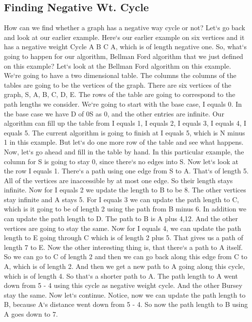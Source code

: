 \subsection{Finding Negative Wt.
Cycle}
How can we find whether a graph has a negative way cycle or not? Let`s go back and look at our earlier example.
Here`s our earlier example on six vertices and it has a negative weight Cycle A B C A, which is of length negative one.
So, what`s going to happen for our algorithm, Bellman Ford algorithm that we just defined on this example? Let`s look at the Bellman Ford algorithm on this example.
We`re going to have a two dimensional table.
The columns the columns of the tables are going to be the vertices of the graph.
There are six vertices of the graph, S, A, B, C, D, E\@.
The rows of the table are going to correspond to the path lengths we consider.
We`re going to start with the base case, I equals 0.
In the base case we have D of 0S as 0, and the other entries are infinite.
Our algorithm can fill up the table from I equals 1, I equals 2, I equals 3, I equals 4, I equals 5.
The current algorithm is going to finish at I equals 5, which is N minus 1 in this example.
But let`s do one more row of the table and see what happens.
Now, let`s go ahead and fill in the table by hand.
In this particular example, the column for S is going to stay 0, since there`s no edges into S\@.
Now let`s look at the row I equals 1.
There`s a path using one edge from S to A\@.
That`s of length 5.
All of the vertices are inaccessible by at most one edge.
So their length stays infinite.
Now for I equals 2 we update the length to B to be 8.
The other vertices stay infinite and A stays 5.
For I equals 3 we can update the path length to C, which is it going to be of length 2 using the path from B minus 6.
In addition we can update the path length to D\@.
The path to B is A plus 4,12.
And the other vertices are going to stay the same.
Now for I equals 4, we can update the path length to E going through C which is of length 2 plus 5.
That gives us a path of length 7 to E\@.
Now the other interesting thing is, that there`s a path to A itself.
So we can go to C of length 2 and then we can go back along this edge from C to A, which is of length 2.
And then we get a new path to A going along this cycle, which is of length 4.
So that`s a shorter path to A\@.
The path length to A went down from 5 - 4 using this cycle as negative weight cycle.
And the other Bursey stay the same.
Now let`s continue.
Notice, now we can update the path length to B, because A`s distance went down from 5 - 4.
So now the path length to B using A goes down to 7.
